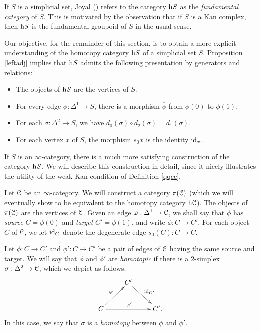 \begin{1.2.3 The homotopy category}
\begin{remark}
If $S$ is a simplicial set, Joyal (\cite{joyalnotpub}) refers to the category $\rm{h} \it{S}$ as the {\it fundamental
category} of $S$. This is motivated by the observation that if $S$ is a Kan complex, then $\rm{h} \it{S}$ is
the fundamental groupoid of $S$ in the usual sense.
\end{remark}

Our objective, for the remainder of this section, is to obtain a more explicit understanding of
the homotopy category $\rm{h} \it{S}$ of a simplicial set $S$. Proposition \ref{leftadj} implies that $\rm{h} \it{S}$ 
admits the following presentation by generators and relations:

\begin{itemize}
\item The objects of $\rm{h} \it{S}$ are the vertices of $S$.

\item For every edge $\phi: \Delta^1 \rightarrow S$, there is a morphism $\overline{\phi}$ from
$\phi(0)$ to $\phi(1)$.

\item For each $\sigma: \Delta^2 \rightarrow S$, we have $\overline{d_0(\sigma)} \circ \overline{d_2(\sigma)} = \overline{d_1(\sigma)}$.

\item For each vertex $x$ of $S$, the morphism $\overline{s_0 x}$ is the identity $\operatorname{id}_x$. 
\end{itemize}

If $S$ is an $\infty$-category, there is a much more satisfying construction of the category $\rm{h} \it{S}$.
We will describe this construction in detail, since it nicely illustrates the utility of the weak Kan condition of Definition \ref{qqcc}.

Let $\operatorname{\mathcal{C}}$ be an $\infty$-category. We will construct a category $\pi(\operatorname{\mathcal{C}})$
(which we will eventually show to be equivalent to the homotopy category $\rm{h} \it{\operatorname{\mathcal{C}}}$). The objects of $\pi(\operatorname{\mathcal{C}})$ are the vertices of $\operatorname{\mathcal{C}}$. Given an
edge $\varphi: \Delta^1 \rightarrow \operatorname{\mathcal{C}}$, we shall say that $\phi$ has {\it source}
$C= \phi(0)$ and {\it target} $C' = \phi(1) $, and write $\phi:
C \rightarrow C'$. For each object $C$ of $\operatorname{\mathcal{C}}$, we
let $\operatorname{id}_{C}$ denote the degenerate edge $s_0(C): C \rightarrow C$.

Let $\phi: C \rightarrow C'$ and $\phi': C \rightarrow C'$ be a pair of edges of $\operatorname{\mathcal{C}}$ having
the same source and target. We will say that $\phi$ and $\phi'$ are {\it homotopic} if
there is a $2$-simplex $\sigma: \Delta^2 \rightarrow \operatorname{\mathcal{C}}$, which we depict as follows:
$$ \xymatrix{
& C' \ar[dr]^{\id_{C'}} & \\
C \ar[ur]^{\phi} \ar[rr]^{\phi'} & & C'.}$$
In this case, we say that $\sigma$ is a {\it homotopy} between $\phi$ and $\phi'$.


\end{1.2.3 The homotopy category}
